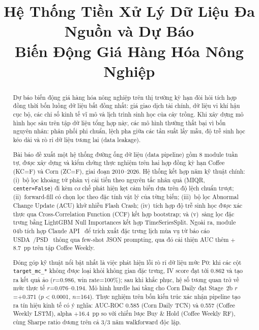 \documentclass[conference]{IEEEtran}
\begin{document}
\title{Hệ Thống Tiền Xử Lý Dữ Liệu Đa Nguồn và Dự Báo\\
Biến Động Giá Hàng Hóa Nông Nghiệp}

\author{
}

\maketitle

\begin{abstract}
Dự báo biến động giá hàng hóa nông nghiệp trên thị trường kỳ hạn đòi hỏi
tích hợp đồng thời bốn luồng dữ liệu bất đồng nhất: giá giao dịch tài chính,
dữ liệu vi khí hậu cục bộ, các chỉ số kinh tế vĩ mô và lịch trình sinh học
của cây trồng. Khi xây dựng mô hình học sâu trên tập dữ liệu tổng hợp này,
các mô hình thường thất bại vì bốn nguyên nhân: phân phối phi chuẩn, lệch
pha giữa các tần suất lấy mẫu, độ trễ sinh học kéo dài và rò rỉ dữ liệu
tương lai (data leakage).

Bài báo đề xuất một hệ thống đường ống dữ liệu (data pipeline) gồm 8 module
tuần tự, được xây dựng và kiểm chứng thực nghiệm trên hai hợp đồng kỳ hạn
Coffee (KC=F) và Corn (ZC=F), giai đoạn 2010--2026. Hệ thống kết hợp năm kỹ
thuật chính: (i)~bộ lọc khoảng tứ phân vị cải tiến theo nguyên tắc nhân quả
(MIQR, \texttt{center=False}) đi kèm cơ chế phát hiện kẹt cảm biến dựa trên
độ lệch chuẩn trượt; (ii)~forward-fill có chọn lọc theo đặc tính vật lý của
từng biến; (iii)~bộ lọc Abnormal Change Update (ACU) khử nhiễu Flash Crash;
(iv)~tích hợp độ trễ sinh học được xác thực qua Cross-Correlation Function
(CCF) kết hợp bootstrap; và (v)~sàng lọc đặc trưng bằng LightGBM Null
Importances kết hợp TimeSeriesSplit. Ngoài ra, module 04b tích hợp Claude
API~\cite{anthropic2024} để trích xuất đặc trưng lịch mùa vụ từ báo cáo
USDA~\cite{usda_nass}/PSD~\cite{usda_fas} thông qua few-shot JSON prompting,
qua đó cải thiện AUC thêm $+$8.7~pp trên tập Coffee Weekly.

Đóng góp kỹ thuật nổi bật nhất là việc phát hiện lỗi rò rỉ dữ liệu mức P0:
khi các cột \texttt{target\_mc\_*} không được loại khỏi không gian đặc trưng,
IV score đạt tới 0.862 và tạo ra kết quả ảo ($r$=0.986, win rate=100\%); sau
khi khắc phục, hệ số tương quan trở về mức thực tế $r$=0.076--0.194. Mô hình
hurdle hai tầng cho Corn Daily đạt Stage~2b $r$=+0.371 ($p<$0.0001, $n$=164).
Thực nghiệm trên bốn kiến trúc xác nhận pipeline tạo ra tín hiệu kinh tế có
ý nghĩa: AUC-ROC 0.585 (Corn Daily TCN) và 0.557 (Coffee Weekly LSTM), alpha
$+$16.4~pp so với chiến lược Buy \& Hold (Coffee Weekly RF), cùng Sharpe
ratio dương trên cả 3/3 năm walkforward độc lập.
\end{abstract}
\end{document}
